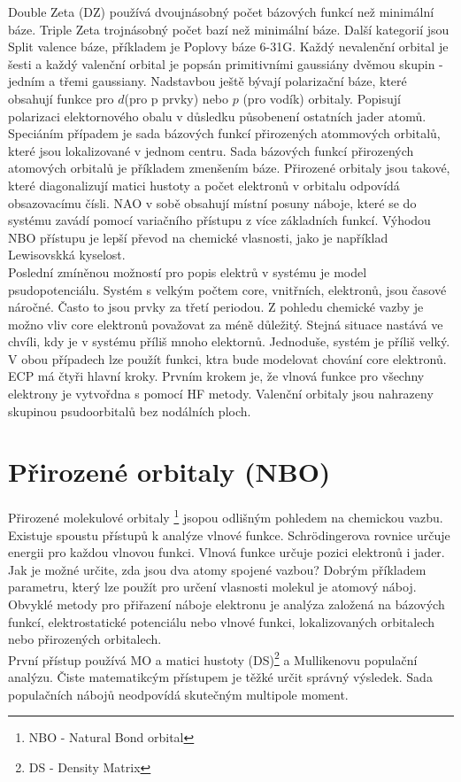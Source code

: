\documentclass[
  digital, %
  table,   %
  lof,     %
  lot,     %
  oneside,
]{fithesis3}
\begin{document}
Double Zeta (DZ) používá dvoujnásobný počet bázových funkcí než minimální báze. Triple Zeta trojnásobný počet bazí než minimální báze. Další kategorií jsou Split valence báze, příkladem je Poplovy báze 6-31G. Každý nevalenční orbital je šesti a každý valenční orbital je popsán primitivními gaussiány dvěmou skupin - jedním a třemi gaussiany. Nadstavbou ještě bývají polarizační báze, které obsahují funkce pro $d$(pro p prvky) nebo $p$ (pro vodík) orbitaly. Popisují polarizaci elektornového obalu v důsledku působenení ostatních jader atomů. \\
Speciáním případem je sada bázových funkcí přirozených atommových orbitalů, které jsou lokalizované v jednom centru. Sada bázových funkcí přirozených atomových orbitalů je příkladem zmenšením báze. Přirozené orbitaly jsou takové, které diagonalizují matici hustoty a počet elektronů v orbitalu odpovídá obsazovacímu čísli. NAO v sobě obsahují místní posuny náboje, které se do systému zavádí pomocí variačního přístupu z více základních funkcí. Výhodou NBO přístupu je lepší převod na chemické vlasnosti, jako je například Lewisovskká kyselost. \\
Poslední zmíněnou možností pro popis elektrů v systému je model psudopotenciálu. Systém s velkým počtem core, vnitřních, elektronů, jsou časové náročné. Často to jsou prvky za třetí periodou. Z pohledu chemické vazby je možno vliv core elektronů považovat za méně důležitý. Stejná situace nastává ve chvíli, kdy je v systému příliš mnoho elektornů. Jednoduše, systém je příliš velký. V obou případech lze použít funkci, ktra bude modelovat chování core elektronů. ECP má čtyři hlavní kroky. Prvním krokem je, že vlnová funkce pro všechny elektrony je vytvořdna s pomocí HF metody. Valenční orbitaly jsou nahrazeny skupinou psudoorbitalů bez nodálních ploch.

\section{Přirozené orbitaly (NBO)}
Přirozené molekulové orbitaly \footnote{NBO - Natural Bond orbital} jsopou odlišným pohledem na chemickou vazbu. Existuje spoustu přístupů k analýze vlnové funkce. Schrödingerova rovnice určuje energii pro každou vlnovou funkci. Vlnová funkce určuje pozici elektronů i jader. Jak je možné určite, zda jsou dva atomy spojené vazbou? Dobrým příkladem parametru, který lze použít pro určení vlasnosti molekul je atomový náboj. Obvyklé metody pro přiřazení náboje elektronu je analýza založená na bázových funkcí, elektrostatické potenciálu nebo vlnové funkci, lokalizovaných orbitalech nebo přirozených orbitalech. \\
První přístup používá MO a matici hustoty (DS)\footnote{DS - Density Matrix} a Mullikenovu populační analýzu. Čiste matematikcým přístupem je těžké určit správný výsledek. Sada populačních nábojů neodpovídá skutečným multipole moment.
\end{document}
